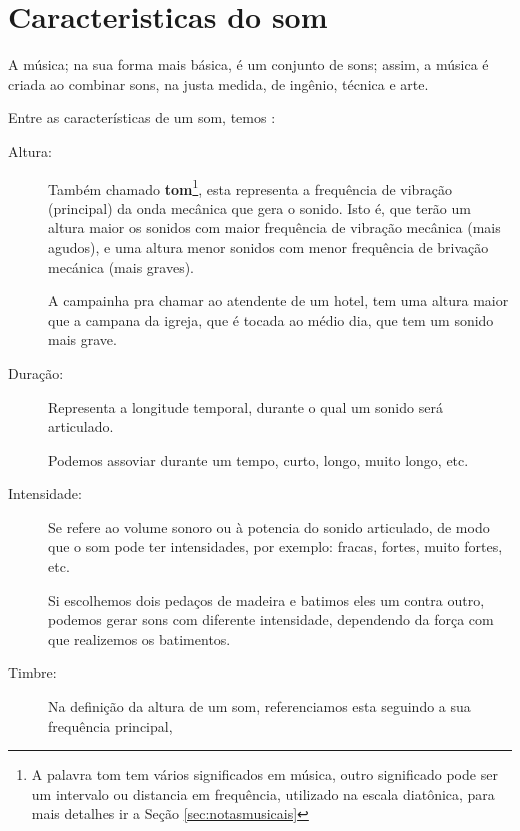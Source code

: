 
\section{Caracteristicas do som}

A música; na sua forma mais básica,  é um conjunto de sons; assim, 
a música é criada ao combinar sons, na justa medida, de 
ingênio, técnica e arte.

Entre as características de um som, temos \cite[pp. 12]{medteoria} :
\begin{description}
\item [Altura:] \label{sec:pos:Altura} 
Também chamado \textbf{tom}\footnote{A palavra tom tem vários significados em música, 
outro significado pode ser um intervalo ou distancia em frequência, 
utilizado na escala diatônica, para mais detalhes ir a Seção \ref{sec:notasmusicais}}, esta representa a frequência de vibração (principal) da onda mecânica que gera o sonido.
Isto é, que terão um altura maior os sonidos com maior frequência de vibração mecânica (mais agudos), 
e uma altura menor sonidos com menor frequência de brivação mecánica (mais graves).
\begin{example}
A campainha pra chamar ao atendente de um hotel, 
tem uma altura maior que a campana da igreja, 
que é tocada ao médio dia, que tem um sonido mais grave.
\end{example} 
\item [Duração:] \label{sec:pos:Duracion}
Representa a longitude temporal, durante o qual um sonido será articulado.
\begin{example}
Podemos assoviar durante um tempo, curto, longo, muito longo, etc.
\end{example} 
\item [Intensidade:] \label{sec:pos:Intensidade}
Se refere ao volume sonoro ou à potencia do sonido articulado, 
de modo que o som pode ter intensidades, por exemplo: fracas, fortes, muito fortes, etc.  
\begin{example}
Si escolhemos dois pedaços de madeira e batimos eles um contra outro, 
podemos gerar sons com diferente intensidade, dependendo da força com que realizemos os batimentos.
\end{example} 
\item [Timbre:] \label{sec:pos:timbre}
Na definição da altura de um som, referenciamos esta seguindo a sua frequência principal,

\end{description}
